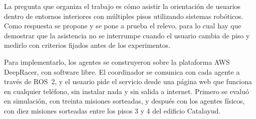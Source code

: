 La pregunta que organiza el trabajo es cómo asistir la orientación de usuarios dentro
de entornos interiores con múltiples pisos utilizando sistemas robóticos. Como respuesta se propone y se pone a prueba el relevo, para lo cual hay que demostrar que la
asistencia no se interrumpe cuando el usuario cambia de piso y medirlo con criterios
fijados antes de los experimentos.

Para implementarlo, los agentes se construyeron sobre la plataforma AWS DeepRacer, con software libre. El
coordinador se comunica con cada agente a través de ROS~2, y el usuario pide el
servicio desde una página web que funciona en cualquier teléfono, sin instalar nada y
sin salida a internet. Primero se evaluó en simulación, con treinta misiones sorteadas, y después con los agentes físicos, con diez misiones sorteadas
entre los pisos 3 y 4 del edificio Catalayud.
